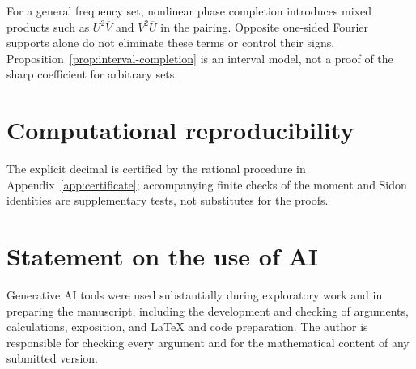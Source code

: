 \documentclass[11pt,reqno]{amsart}
\numberwithin{equation}{section}
\theoremstyle{definition}
\theoremstyle{remark}
\begin{document}
For a general frequency set, nonlinear phase completion introduces
mixed products such as $U^2\overline V$ and $V^2\overline U$ in the
pairing. Opposite one-sided Fourier supports alone do not eliminate
these terms or control their signs. Proposition~\ref{prop:interval-completion}
is an interval model, not a proof of the sharp coefficient for arbitrary
sets.

\section*{Computational reproducibility}
The explicit decimal is certified by the rational procedure in
Appendix~\ref{app:certificate}; accompanying finite checks of the
moment and Sidon identities are supplementary tests, not substitutes
for the proofs.

\section*{Statement on the use of AI}
Generative AI tools were used substantially during exploratory work and
in preparing the manuscript, including the development and checking of
arguments, calculations, exposition, and \LaTeX{} and code preparation.
The author is responsible for checking every argument and for the
mathematical content of any submitted version.
\end{document}
